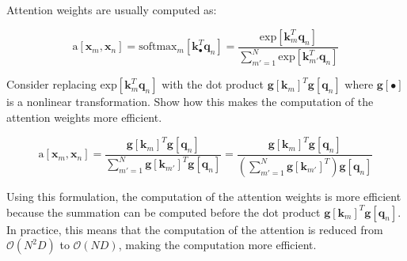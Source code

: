 \documentclass[12pt]{report}
\begin{document}
\subsection{}
\begin{mdframed}
    Attention weights are usually computed as:

    \begin{equation*}
        \text{a}[\mathbf{x}_{m}, \mathbf{x}_{n}] = \text{softmax}_{m}\left[\mathbf{k}^{T}_{\bullet}\mathbf{q}_{n}\right] = \frac{\text{exp}[\mathbf{k}^{T}_{m}\mathbf{q}_{n}]}{\sum_{m'=1}^{N} \text{exp}[\mathbf{k}^{T}_{m'}\mathbf{q}_{n}]}
    \end{equation*}

    Consider replacing $\text{exp}[\mathbf{k}^{T}_{m}\mathbf{q}_{n}]$ with the dot product $\mathbf{g}[\mathbf{k}_{m}]^{T}\mathbf{g}[\mathbf{q}_{n}]$ where $\mathbf{g}[\bullet]$ is a nonlinear  transformation. Show how this makes the computation of the attention weights more eﬀicient.
\end{mdframed}

\begin{equation*}
    \text{a}[\mathbf{x}_{m}, \mathbf{x}_{n}] = \frac{\mathbf{g}[\mathbf{k}_{m}]^{T}\mathbf{g}[\mathbf{q}_{n}]}{\sum_{m'=1}^{N} \mathbf{g}[\mathbf{k}_{m'}]^{T}\mathbf{g}[\mathbf{q}_{n}]} = \frac{\mathbf{g}[\mathbf{k}_{m}]^{T}\mathbf{g}[\mathbf{q}_{n}]}{\left(\sum_{m'=1}^{N} \mathbf{g}[\mathbf{k}_{m'}]^{T}\right)\mathbf{g}[\mathbf{q}_{n}]}
\end{equation*}

Using this formulation, the computation of the attention weights is more efficient because the summation can be computed before the dot product $\mathbf{g}[\mathbf{k}_{m}]^{T}\mathbf{g}[\mathbf{q}_{n}]$. In practice, this means that the computation of the attention is reduced from $\mathcal{O}(N^{2}D)$ to $\mathcal{O}(ND)$, making the computation more efficient.
\end{document}
